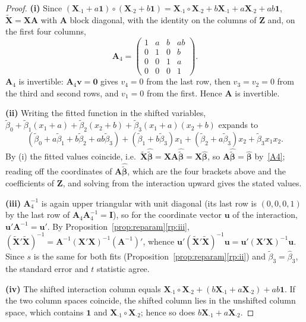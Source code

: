 \documentclass[14pt]{extarticle}
\theoremstyle{plain}
\theoremstyle{definition}
\theoremstyle{remark}
\newcommand{\bX}{\mathbf{X}}
\def\bb{\boldsymbol{\beta}}
\newcommand{\bI}{\mathbf{I}}
\newcommand{\bone}{\mathbf{1}}
\newcommand{\bzero}{\mathbf{0}}
\newcommand{\bA}{\mathbf{A}}
\newcommand{\bv}{\mathbf{v}}
\begin{document}
\begin{proof}
\textbf{(i)} Since $(\bX_{\cdot 1} + a\bone) \circ (\bX_{\cdot 2} + b\bone) = \bX_{\cdot 1} \circ \bX_{\cdot 2} + b\bX_{\cdot 1} + a\bX_{\cdot 2} + ab\bone$, $\tilde{\bX} = \bX\bA$ with $\bA$ block diagonal, with the identity on the columns of $\mathbf{Z}$ and, on the first four columns,
\[
\bA_4 = \begin{pmatrix} 1 & a & b & ab\\ 0 & 1 & 0 & b\\ 0 & 0 & 1 & a\\ 0 & 0 & 0 & 1\end{pmatrix}.
\]
$\bA_4$ is invertible: $\bA_4\bv = \bzero$ gives $v_4 = 0$ from the last row, then $v_3 = v_2 = 0$ from the third and second rows, and $v_1 = 0$ from the first. Hence $\bA$ is invertible.

\textbf{(ii)} Writing the fitted function in the shifted variables, $\tilde\beta_0 + \tilde\beta_1(x_1 + a) + \tilde\beta_2(x_2 + b) + \tilde\beta_3(x_1 + a)(x_2 + b)$ expands to
\[
(\tilde\beta_0 + a\tilde\beta_1 + b\tilde\beta_2 + ab\tilde\beta_3) + (\tilde\beta_1 + b\tilde\beta_3)x_1 + (\tilde\beta_2 + a\tilde\beta_3)x_2 + \tilde\beta_3x_1x_2.
\]
By (i) the fitted values coincide, i.e.\ $\tilde{\bX}\hat{\tilde{\bb}} = \bX\bA\hat{\tilde{\bb}} = \bX\hat{\bb}$, so $\bA\hat{\tilde{\bb}} = \hat{\bb}$ by~\ref{A4}; reading off the coordinates of $\bA\hat{\tilde{\bb}}$, which are the four brackets above and the coefficients of $\mathbf{Z}$, and solving from the interaction upward gives the stated values.

\textbf{(iii)} $\bA_4^{-1}$ is again upper triangular with unit diagonal (its last row is $(0, 0, 0, 1)$ by the last row of $\bA_4\bA_4^{-1} = \bI$), so for the coordinate vector $\mathbf{u}$ of the interaction, $\mathbf{u}'\bA^{-1} = \mathbf{u}'$. By Proposition~\ref{prop:reparam}\ref{rp:iii}, $(\tilde{\bX}'\tilde{\bX})^{-1} = \bA^{-1}(\bX'\bX)^{-1}(\bA^{-1})'$, whence $\mathbf{u}'(\tilde{\bX}'\tilde{\bX})^{-1}\mathbf{u} = \mathbf{u}'(\bX'\bX)^{-1}\mathbf{u}$. Since $s$ is the same for both fits (Proposition~\ref{prop:reparam}\ref{rp:ii}) and $\tilde\beta_3 = \hat\beta_3$, the standard error and $t$ statistic agree.

\textbf{(iv)} The shifted interaction column equals $\bX_{\cdot 1} \circ \bX_{\cdot 2} + (b\bX_{\cdot 1} + a\bX_{\cdot 2}) + ab\bone$. If the two column spaces coincide, the shifted column lies in the unshifted column space, which contains $\bone$ and $\bX_{\cdot 1} \circ \bX_{\cdot 2}$; hence so does $b\bX_{\cdot 1} + a\bX_{\cdot 2}$.
\end{proof}
\end{document}
